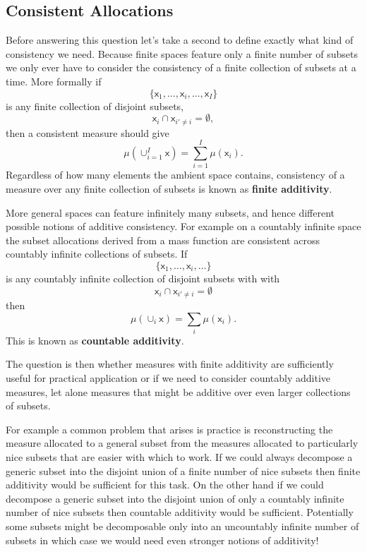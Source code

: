 \documentclass[
  letterpaper,
  DIV=11,
  numbers=noendperiod]{scrartcl}
\begin{document}
\hypertarget{consistent-allocations}{%
\subsection{Consistent Allocations}\label{consistent-allocations}}

Before answering this question let's take a second to define exactly
what kind of consistency we need. Because finite spaces feature only a
finite number of subsets we only ever have to consider the consistency
of a finite collection of subsets at a time. More formally if \[
\{ \mathsf{x}_{1}, \ldots, \mathsf{x}_{i}, \ldots, \mathsf{x}_{I} \}
\] is any finite collection of disjoint subsets, \[
\mathsf{x}_{i} \cap \mathsf{x}_{i' \ne i} = \emptyset,
\] then a consistent measure should give \[
\mu( \cup_{i = 1}^{I} \mathsf{x} )
=
\sum_{i = 1}^{I} \mu( \mathsf{x}_{i}).
\] Regardless of how many elements the ambient space contains,
consistency of a measure over any finite collection of subsets is known
as \textbf{finite additivity}.

More general spaces can feature infinitely many subsets, and hence
different possible notions of additive consistency. For example on a
countably infinite space the subset allocations derived from a mass
function are consistent across countably infinite collections of
subsets. If \[
\{ \mathsf{x}_{1}, \ldots, \mathsf{x}_{i}, \ldots \}
\] is any countably infinite collection of disjoint subsets with with \[
\mathsf{x}_{i} \cap \mathsf{x}_{i' \ne i} = \emptyset
\] then \[
\mu( \cup_{i} \mathsf{x} )
=
\sum_{i} \mu( \mathsf{x}_{i}).
\] This is known as \textbf{countable additivity}.

The question is then whether measures with finite additivity are
sufficiently useful for practical application or if we need to consider
countably additive measures, let alone measures that might be additive
over even larger collections of subsets.

For example a common problem that arises is practice is reconstructing
the measure allocated to a general subset from the measures allocated to
particularly nice subsets that are easier with which to work. If we
could always decompose a generic subset into the disjoint union of a
finite number of nice subsets then finite additivity would be sufficient
for this task. On the other hand if we could decompose a generic subset
into the disjoint union of only a countably infinite number of nice
subsets then countable additivity would be sufficient. Potentially some
subsets might be decomposable only into an uncountably infinite number
of subsets in which case we would need even stronger notions of
additivity!
\end{document}

